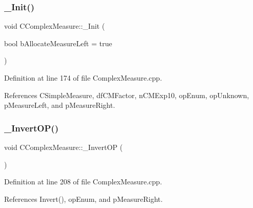 \subsubsection{\texorpdfstring{\+\_\+\+Init()}{\_Init()}}
{\footnotesize\ttfamily void C\+Complex\+Measure\+::\+\_\+\+Init (\begin{DoxyParamCaption}\item[{bool}]{b\+Allocate\+Measure\+Left = {\ttfamily true} }\end{DoxyParamCaption})\hspace{0.3cm}{\ttfamily [protected]}}



Definition at line 174 of file Complex\+Measure.\+cpp.



References C\+Simple\+Measure, df\+C\+M\+Factor, n\+C\+M\+Exp10, op\+Enum, op\+Unknown, p\+Measure\+Left, and p\+Measure\+Right.

\mbox{\label{classCComplexMeasure_a6f071c1bd1340fea78a2aa90d1b6496f}} 
\subsubsection{\texorpdfstring{\+\_\+\+Invert\+O\+P()}{\_InvertOP()}}
{\footnotesize\ttfamily void C\+Complex\+Measure\+::\+\_\+\+Invert\+OP (\begin{DoxyParamCaption}{ }\end{DoxyParamCaption})\hspace{0.3cm}{\ttfamily [protected]}}



Definition at line 208 of file Complex\+Measure.\+cpp.



References Invert(), op\+Enum, and p\+Measure\+Right.

\mbox{\label{classCComplexMeasure_abd62182294ebd217cdd9af40d0af7e38}} 

